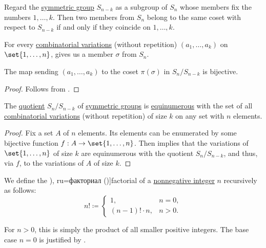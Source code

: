 \begin{lemma}\label{thm:combinatorial_and_algebraic_permutation_quotient_lemma}
  Regard the \hyperref[def:symmetric_group]{symmetric group} \( S_{n - k} \) as a subgroup of \( S_n \) whose members fix the numbers \( 1, \ldots, k \). Then two members from \( S_n \) belong to the same coset with respect to \( S_{n - k} \) if and only if they coincide on \( 1, \ldots, k \).

  For every \hyperref[def:combinatorial_variation]{combinatorial variations} (without repetition) \( (a_1, \ldots, a_k) \) on \( \set{ 1, \ldots, n } \),  gives us a member \( \sigma \) from \( S_n \).

  The map sending \( (a_1, \ldots, a_k) \) to the coset \( \pi(\sigma) \) in \( S_n / S_{n - k} \) is bijective.
\end{lemma}
\begin{proof}
  Follows from .
\end{proof}

\begin{proposition}\label{thm:combinatorial_and_algebraic_permutation_quotient}
  The \hyperref[def:group/quotient]{quotient} \( S_n / S_{n - k} \) of \hyperref[def:symmetric_group]{symmetric groups} is \hyperref[def:equinumerosity]{equinumerous} with the set of all \hyperref[def:combinatorial_variation]{combinatorial variations} (without repetition) of size \( k \) on any set with \( n \) elements.
\end{proposition}
\begin{proof}
  Fix a set \( A \) of \( n \) elements. Its elements can be enumerated by some bijective function \( f: A \to \set{ 1, \ldots, n } \). Then  implies that the variations of \( \set{ 1, \ldots, n } \) of size \( k \) are equinumerous with the quotient \( S_n / S_{n - k} \), and thus, via \( f \), to the variations of \( A \) of size \( k \).
\end{proof}

\begin{definition}\label{def:factorial}
  We define the \term[bg=факториел (\cite[129]{Тагамлицки1971Диф}), ru=факториал (\cite[145]{АлександровМаркушевичХинчин1952ЭнциклопедияТом3})]{factorial} of a \hyperref[def:integer_signum]{nonnegative integer} \( n \) recursively as follows:
  \begin{equation}\label{eq:def:factorial}
    n! \coloneqq \begin{cases}
      1,                &n = 0, \\
      (n - 1)! \cdot n, &n > 0.
    \end{cases}
  \end{equation}
\end{definition}
\begin{comments}
  \item For \( n > 0 \), this is simply the product of all smaller positive integers. The base case \( n = 0 \) is justified by .
\end{comments}

